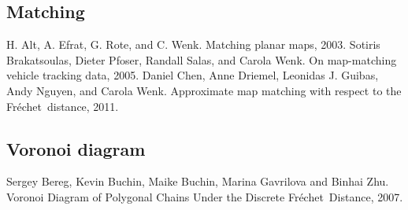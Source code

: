 \documentclass[a4paper,onecolumn]{article}
\numberwithin{equation}{section}
\numberwithin{figure}{section}
\numberwithin{algorithm}{section}
\theoremstyle{plain}
\theoremstyle{definition}
\theoremstyle{remark}
\newcommand{\frechet}{Fr\'echet}
\begin{document}
\subsection{Matching}
H. Alt, A. Efrat, G. Rote, and C. Wenk. Matching planar maps, 2003.
Sotiris Brakatsoulas, Dieter Pfoser, Randall Salas, and Carola Wenk. On map-matching vehicle tracking data, 2005.
Daniel Chen, Anne Driemel, Leonidas J. Guibas, Andy Nguyen, and Carola Wenk. Approximate map matching with respect to the \frechet\ distance, 2011.
\subsection{Voronoi diagram}
Sergey Bereg, Kevin Buchin, Maike Buchin, Marina Gavrilova and Binhai Zhu. Voronoi Diagram of Polygonal Chains Under the Discrete \frechet\ Distance, 2007.



\end{document}
